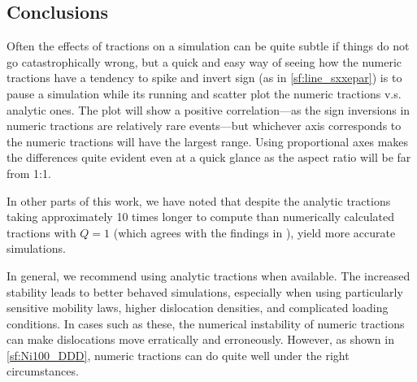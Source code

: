 \subsection{Conclusions}\label{ss:paperConclusion}

Often the effects of tractions on a simulation can be quite subtle if things do not go catastrophically wrong, but a quick and easy way of seeing how the numeric tractions have a tendency to spike and invert sign (as in \cref{sf:line_sxxepar}) is to pause a simulation while its running and scatter plot the numeric tractions v.s. analytic ones. The plot will show a positive correlation---as the sign inversions in numeric tractions are relatively rare events---but whichever axis corresponds to the numeric tractions will have the largest range. Using proportional axes makes the differences quite evident even at a quick glance as the aspect ratio will be far from 1:1.

In other parts of this work, we have noted that despite the analytic tractions taking approximately 10 times longer to compute than numerically calculated tractions with $Q = 1$ (which agrees with the findings in \cite{analytic_tractions}), yield more accurate simulations.

In general, we recommend using analytic tractions when available. The increased stability leads to better behaved simulations, especially when using particularly sensitive mobility laws, higher dislocation densities, and complicated loading conditions. In cases such as these, the numerical instability of numeric tractions can make dislocations move erratically and erroneously. However, as shown in \cref{sf:Ni100_DDD}, numeric tractions can do quite well under the right circumstances.


